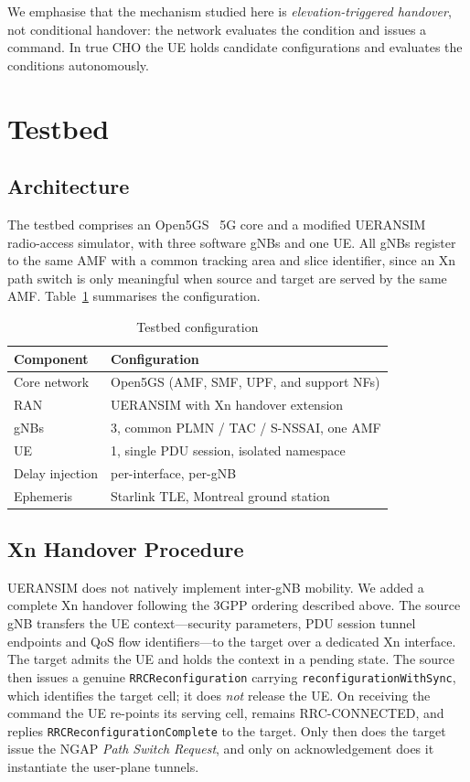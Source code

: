 \documentclass[conference]{IEEEtran}
\begin{document}
We emphasise that the mechanism studied here is \emph{elevation-triggered
handover}, not conditional handover: the network evaluates the condition and
issues a command. In true CHO the UE holds candidate configurations and
evaluates the conditions autonomously.

\section{Testbed}
\label{sec:testbed}

\subsection{Architecture}

The testbed comprises an Open5GS~\cite{ref_open5gs} 5G core and a modified
UERANSIM~\cite{ref_ueransim} radio-access simulator, with three software gNBs and one UE. All gNBs register to the same
AMF with a common tracking area and slice identifier, since an Xn path switch is
only meaningful when source and target are served by the same AMF.
Table~\ref{tab:testbed} summarises the configuration.

\begin{table}[t]
\caption{Testbed configuration}
\label{tab:testbed}
\centering
\begin{tabular}{ll}
\toprule
Component & Configuration \\
\midrule
Core network & Open5GS (AMF, SMF, UPF, and support NFs) \\
RAN & UERANSIM with Xn handover extension \\
gNBs & 3, common PLMN / TAC / S-NSSAI, one AMF \\
UE & 1, single PDU session, isolated namespace \\
Delay injection & per-interface, per-gNB \\
Ephemeris & Starlink TLE, Montreal ground station \\
\bottomrule
\end{tabular}
\end{table}

\subsection{Xn Handover Procedure}

UERANSIM does not natively implement inter-gNB mobility. We added a complete Xn
handover following the 3GPP ordering described above. The source gNB transfers
the UE context---security parameters, PDU session tunnel endpoints and QoS flow
identifiers---to the target over a dedicated Xn interface. The target admits the
UE and holds the context in a pending state. The source then issues a genuine
\texttt{RRCReconfiguration} carrying \texttt{reconfigurationWithSync}, which
identifies the target cell; it does \emph{not} release the UE. On receiving the
command the UE re-points its serving cell, remains RRC-CONNECTED, and replies
\texttt{RRCReconfigurationComplete} to the target. Only then does the target
issue the NGAP \emph{Path Switch Request}, and only on acknowledgement does it
instantiate the user-plane tunnels.
\end{document}
